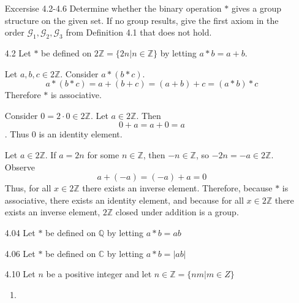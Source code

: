 \documentclass[12pt]{article}
\newcommand{\Z}{\mathds{Z}}
\newcommand{\C}{\mathbb{C}}
\newcommand{\Q}{\mathbb{Q}}
\begin{document}

	\begin{enumerate}
		
		\item[Excersise 4.2-4.6]Determine whether the binary operation $*$ gives a group structure on the given set. If no group results, give the first axiom in the order $\mathscr{G}_1,\mathscr{G}_2, \mathscr{G}_3$ from Definition 4.1 that does not hold.
			\item[4.2] Let $*$ be defined on $2\Z = \{2n|n\in \Z\}$ by letting $a * b = a + b$.
			
			Let $a,b,c \in 2\Z$.
			Consider $a*(b* c)$. \[a* (b * c) = a + (b + c) = (a + b) + c = (a* b)* c\] Therefore $*$ is associative.
			
			Consider $0 = 2\cdot 0 \in 2 \Z$. Let $a \in 2\Z$. Then \[ 0 + a = a + 0 = a\]. Thus 0 is an identity element.
			
			Let $a \in 2\Z$. If $a = 2n$ for some $n\in \Z$, then $-n \in \Z$, so $-2n = -a \in 2\Z$. Observe \[a + (-a) = (-a) + a = 0\]
			Thus, for all $x \in 2\Z$ there exists an inverse element.
			Therefore, because $*$ is associative, there exists an identity element, and because for all $x \in 2\Z$ there exists an inverse element, $2\Z$ closed under addition is a group.
			
			\item[4.04] Let $*$ be defined on $\Q$ by letting $a* b = ab$
			\item[4.06] Let $*$ be defined on $\C$ by letting $a* b = |ab|$
			\item[4.10] Let $n$ be a positive integer and let $n\in\Z = \{nm | m\in Z\}$
			\begin{enumerate}
				\item 
				

\end{enumerate}
\end{enumerate}
\end{document}
